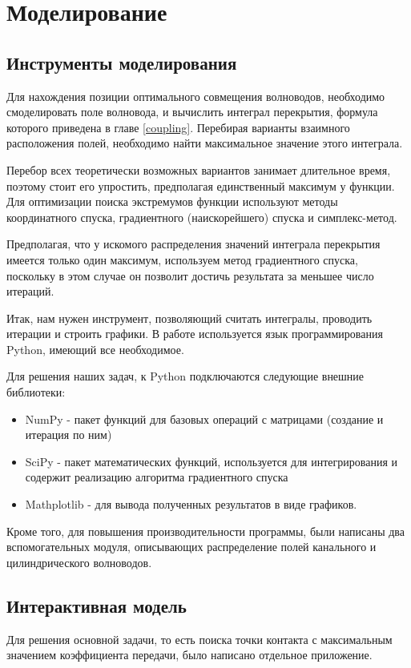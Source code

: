 \chapter{Моделирование}
\section{Инструменты моделирования}
Для нахождения позиции оптимального совмещения волноводов, необходимо смоделировать поле волновода, и вычислить интеграл перекрытия, формула которого приведена в главе \ref{coupling}. Перебирая варианты взаимного расположения полей, необходимо найти максимальное значение этого интеграла.

Перебор всех теоретически возможных вариантов занимает длительное время, поэтому стоит его упростить, предполагая единственный максимум у функции. Для оптимизации поиска экстремумов функции используют методы координатного спуска, градиентного (наискорейшего) спуска и симплекс-метод. \cite{numeric} 

Предполагая, что у искомого распределения значений интеграла перекрытия имеется только один максимум, используем метод градиентного спуска, поскольку в этом случае он позволит достичь результата за меньшее число итераций. \cite{mathews}

Итак, нам нужен инструмент, позволяющий считать интегралы, проводить итерации и строить графики. В работе используется язык программирования Python, имеющий все необходимое. 

Для решения наших задач, к Python подключаются следующие внешние библиотеки:
\begin{itemize}
	\item NumPy - пакет функций для базовых операций с матрицами (создание и итерация по ним)
	\item SciPy - пакет математических функций, используется для интегрирования и содержит реализацию алгоритма градиентного спуска
	\item Mathplotlib - для вывода полученных результатов в виде графиков.
\end{itemize}

Кроме того, для повышения производительности программы, были написаны два вспомогательных модуля, описывающих распределение полей канального и цилиндрического волноводов.

\section{Интерактивная модель}
Для решения основной задачи, то есть поиска точки контакта с максимальным значением коэффициента передачи, было написано отдельное приложение.

